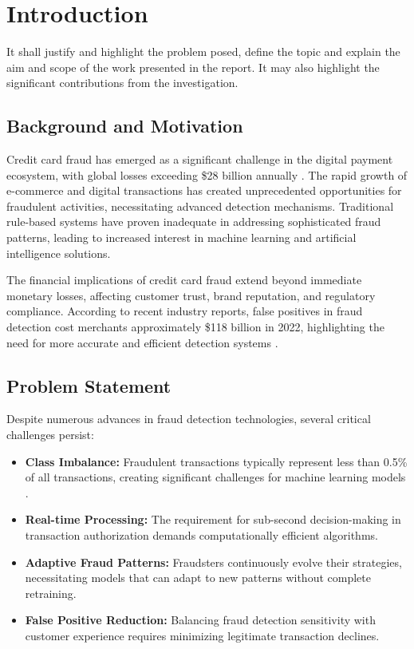 \chapter{Introduction}
It shall justify and highlight the problem posed, define the topic and explain the aim and scope of the work presented in the report. It may also highlight the significant contributions from the investigation.
	
\section{Background and Motivation}

Credit card fraud has emerged as a significant challenge in the digital payment ecosystem, with global losses exceeding \$28 billion annually \cite{knuth1984}. The rapid growth of e-commerce and digital transactions has created unprecedented opportunities for fraudulent activities, necessitating advanced detection mechanisms. Traditional rule-based systems have proven inadequate in addressing sophisticated fraud patterns, leading to increased interest in machine learning and artificial intelligence solutions.

The financial implications of credit card fraud extend beyond immediate monetary losses, affecting customer trust, brand reputation, and regulatory compliance. According to recent industry reports, false positives in fraud detection cost merchants approximately \$118 billion in 2022, highlighting the need for more accurate and efficient detection systems \cite{turing1936}.

\section{Problem Statement}

Despite numerous advances in fraud detection technologies, several critical challenges persist:

\begin{itemize}
\item \textbf{Class Imbalance:} Fraudulent transactions typically represent less than 0.5\% of all transactions, creating significant challenges for machine learning models \cite{shannon1948}.
    
\item \textbf{Real-time Processing:} The requirement for sub-second decision-making in transaction authorization demands computationally efficient algorithms.
    
\item \textbf{Adaptive Fraud Patterns:} Fraudsters continuously evolve their strategies, necessitating models that can adapt to new patterns without complete retraining.
    
\item \textbf{False Positive Reduction:} Balancing fraud detection sensitivity with customer experience requires minimizing legitimate transaction declines.
\end{itemize}

